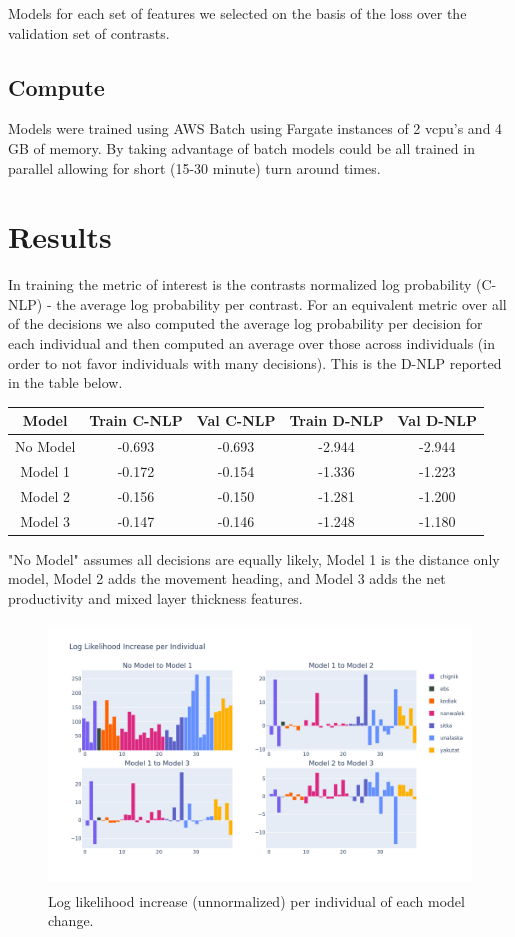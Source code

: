 \documentclass[11pt]{article}
\begin{document}
Models for each set of features we selected on the basis of the loss over the validation set of contrasts. 

\subsection*{Compute}

Models were trained using AWS Batch using Fargate instances of 2 vcpu's and 4 GB of memory. By taking advantage of batch models could be all trained in parallel allowing for short (15-30 minute) turn around times. 

\section*{Results}

In training the metric of interest is the contrasts normalized log probability (C-NLP) - the average log probability per contrast. For an equivalent metric over all of the decisions we also computed the average log probability per decision for each individual and then computed an average over those across individuals (in order to not favor individuals with many decisions). This is the D-NLP reported in the table below. 

\begin{center}
\begin{tabular}{| c | c | c | c | c |}
\hline 
Model & Train C-NLP & Val C-NLP & Train D-NLP & Val D-NLP \\
\hline
No Model & -0.693 & -0.693 & -2.944 & -2.944 \\
Model 1 & -0.172 & -0.154 & -1.336 & -1.223 \\
Model 2 & -0.156 & -0.150 & -1.281 & -1.200 \\
Model 3 & -0.147 & -0.146 & -1.248 & -1.180 \\
\hline
\end{tabular}
\end{center}

"No Model" assumes all decisions are equally likely, Model 1 is the distance only model, Model 2 adds the movement heading, and Model 3 adds the net productivity and mixed layer thickness features. \newline

\begin{figure}[h!] 
	\centering
  \includegraphics[height=70mm]{figures/ll_increase.png}
  \caption{Log likelihood increase (unnormalized) per individual of each model change.}
  \label{fig:ll_increase}
\end{figure}
\end{document}

